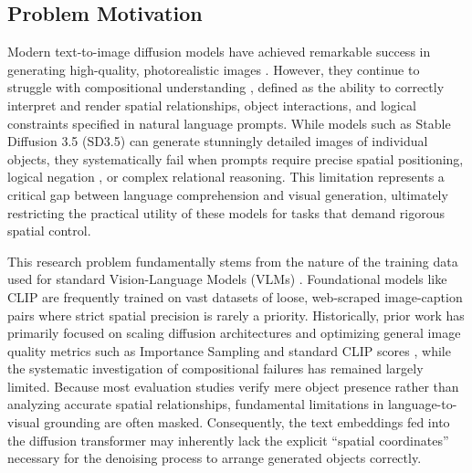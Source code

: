 \subsection{Problem Motivation}
Modern text-to-image diffusion models have achieved remarkable success in generating high-quality, photorealistic images \citep{dhariwal2021diffusionmodelsbeatgans, 9880056, poole2022dreamfusiontextto3dusing2d, saharia2022photorealistictexttoimagediffusionmodels}. However, they continue to struggle with compositional understanding \citep{chatterjee2024gettingrightimprovingspatial, adamkiewicz2026prettyisntusefulinvestigating}, defined as the ability to correctly interpret and render spatial relationships, object interactions, and logical constraints specified in natural language prompts. While models such as Stable Diffusion 3.5 (SD3.5) \citep{esser2024scalingrectifiedflowtransformers, rombach2022highresolutionimagesynthesislatent} can generate stunningly detailed images of individual objects, they systematically fail when prompts require precise spatial positioning, logical negation \citep{ban2024understandingimpactnegativeprompts}, or complex relational reasoning. This limitation represents a critical gap between language comprehension and visual generation, ultimately restricting the practical utility of these models for tasks that demand rigorous spatial control.

This research problem fundamentally stems from the nature of the training data used for standard Vision-Language Models (VLMs) \citep{bordes2024introductionvisionlanguagemodeling}. Foundational models like CLIP \citep{radford2021learningtransferablevisualmodels} are frequently trained on vast datasets of loose, web-scraped image-caption pairs where strict spatial precision is rarely a priority. Historically, prior work has primarily focused on scaling diffusion architectures and optimizing general image quality metrics such as Importance Sampling \citep{grover2019biascorrectionlearnedgenerative} and standard CLIP scores \citep{hessel2022clipscorereferencefreeevaluationmetric}, while the systematic investigation of compositional failures has remained largely limited. Because most evaluation studies verify mere object presence rather than analyzing accurate spatial relationships, fundamental limitations in language-to-visual grounding are often masked. Consequently, the text embeddings fed into the diffusion transformer may inherently lack the explicit ``spatial coordinates'' necessary for the denoising process to arrange generated objects correctly.

